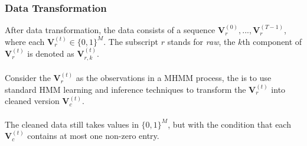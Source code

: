 \begin{frame}
\begin{columns}
\end{columns}

\end{frame}


\begin{frame}
\frametitle{Data Transformation}

After data transformation, the data consists of a sequence $\mathbf{V}_r^{(0)},...,\mathbf{V}_r^{(T-1)}$, where each $\mathbf{V}_r^{(t)} \in \{ 0,1 \}^{M}$. The subscript $r$ stands for \emph{raw}, the $k$th component of $\mathbf{V}_r^{(t)}$ is denoted as $\mathbf{V}_{r,k}^{(t)}$. \\~\\

Consider the $\mathbf{V}_r^{(t)}$ as the observations in a MHMM process, the  is to use standard HMM learning and inference techniques to transform the $\mathbf{V}_r^{(t)}$ into cleaned version $\mathbf{V}_c^{(t)}$. \\~\\

The cleaned data still takes values in  $\{ 0,1 \}^{M}$, but with the condition that each $\mathbf{V}_c^{(t)}$ contains at most one non-zero entry. \\~\\

\end{frame}
